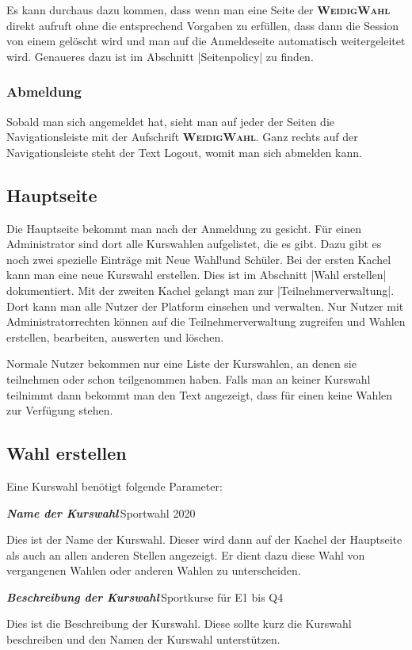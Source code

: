 \documentclass[ngerman]{ltxdoc}
\newcommand{\DescribeOption}[4]{
  \DescribeMacro{#1}
  \begin{minipage}[t]{\textwidth}
    \textit{\textbf{\textcolor{mLightGreen}{#2}}}\dotfill\,#3\par
    \begingroup
    \vspace{0.5em}#4\par
    \endgroup
  \end{minipage}
}
\newcommand{\name}{\textbf{\textsc{WeidigWahl}}\xspace}
\begin{document}
Es kann durchaus dazu kommen, dass wenn man eine Seite der \name direkt aufruft
ohne die entsprechend Vorgaben zu erfüllen, dass dann die Session von einem
gelöscht wird und man auf die Anmeldeseite automatisch weitergeleitet wird.
Genaueres dazu ist im Abschnitt |Seitenpolicy| zu finden.

\subsubsection{Abmeldung}

Sobald man sich angemeldet hat, sieht man auf jeder der Seiten die Navigationsleiste
mit der Aufschrift \name. Ganz rechts auf der Navigationsleiste steht der Text
\glqq Logout\grqq, womit man sich abmelden kann.

\subsection{Hauptseite}

Die Hauptseite bekommt man nach der Anmeldung zu gesicht. Für einen Administrator
sind dort alle Kurswahlen aufgelistet, die es gibt. Dazu gibt es noch zwei spezielle
Einträge mit \glqq Neue Wahl!\grqq und \glqq Schüler\grqq. Bei der ersten Kachel
kann man eine neue Kurswahl erstellen. Dies ist im Abschnitt |Wahl erstellen|
dokumentiert. Mit der zweiten Kachel gelangt man zur |Teilnehmerverwaltung|.
Dort kann man alle Nutzer der Platform einsehen und verwalten. Nur Nutzer mit
Administratorrechten können auf die Teilnehmerverwaltung zugreifen und Wahlen erstellen,
bearbeiten, auswerten und löschen.

Normale Nutzer bekommen nur eine Liste der Kurswahlen, an denen sie teilnehmen oder
schon teilgenommen haben. Falls man an keiner Kurswahl teilnimmt dann bekommt
man den Text angezeigt, dass für einen keine Wahlen zur Verfügung stehen.

\subsection{Wahl erstellen}

Eine Kurswahl benötigt folgende Parameter:

\DescribeOption{Name}{Name der Kurswahl}{Sportwahl 2020}{
  Dies ist der Name der Kurswahl. Dieser wird dann auf der Kachel der Hauptseite
  als auch an allen anderen Stellen angezeigt. Er dient dazu diese Wahl von
  vergangenen Wahlen oder anderen Wahlen zu unterscheiden.
}

\DescribeOption{Beschreibung}{Beschreibung der Kurswahl}{Sportkurse für E1 bis Q4}{
  Dies ist die Beschreibung der Kurswahl. Diese sollte kurz die Kurswahl beschreiben und
  den Namen der Kurswahl unterstützen.
}
\end{document}
